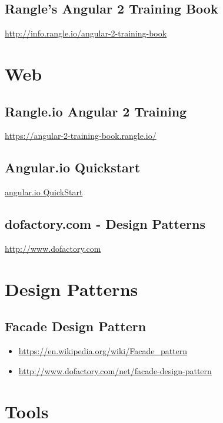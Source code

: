 \documentclass[]{book}
\providecommand{\tightlist}{%
  \setlength{\itemsep}{0pt}\setlength{\parskip}{0pt}}
\theoremstyle{definition}
\theoremstyle{definition}
\theoremstyle{definition}
\theoremstyle{remark}
\begin{document}
\subsection{Rangle's Angular 2 Training
Book}\label{rangles-angular-2-training-book}

\url{http://info.rangle.io/angular-2-training-book}

\section{Web}\label{web}

\subsection{Rangle.io Angular 2
Training}\label{rangle.io-angular-2-training}

\url{https://angular-2-training-book.rangle.io/}

\subsection{Angular.io Quickstart}\label{angular.io-quickstart}

\href{https://angular.io/guide/quickstart}{angular.io QuickStart}

\subsection{dofactory.com - Design
Patterns}\label{dofactory.com---design-patterns}

\url{http://www.dofactory.com}

\section{Design Patterns}\label{design-patterns}

\subsection{Facade Design Pattern}\label{facade-design-pattern}

\begin{itemize}
\tightlist
\item
  \url{https://en.wikipedia.org/wiki/Facade_pattern}
\item
  \url{http://www.dofactory.com/net/facade-design-pattern}
\end{itemize}

\section{Tools}\label{tools-1}
\end{document}

